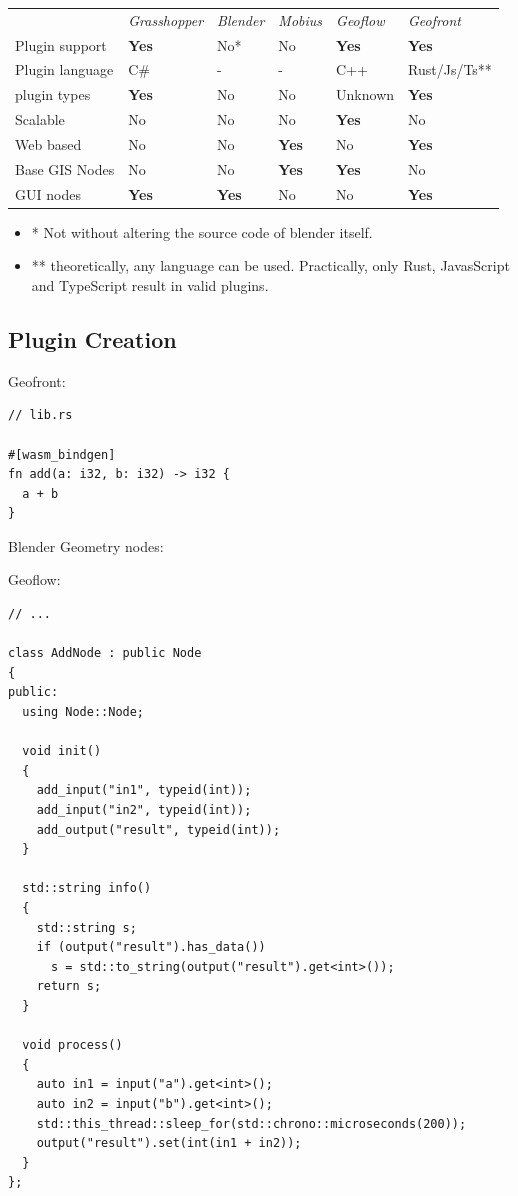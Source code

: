 \begin{tabular}{||p{2.8cm}|l|l|l|l|l||}
                  & \emph{Grasshopper} & \emph{Blender} & \emph{Mobius} & \emph{Geoflow}    & \emph{Geofront}   \\
Plugin support    & \textbf{Yes}  & No*    & No     & \textbf{Yes} & \textbf{Yes} \\
Plugin language   & C\#  & -    & -     & C++ & Rust/Js/Ts** \\
plugin types      & \textbf{Yes}  & No      & No     & Unknown    & \textbf{Yes} \\
Scalable          & No          & No      & No               & \textbf{Yes} & No         \\
Web based         & No          & No      & \textbf{Yes}     & No           & \textbf{Yes} \\
Base GIS Nodes    & No          & No      & \textbf{Yes}     & \textbf{Yes} & No \\
GUI nodes         & \textbf{Yes} & \textbf{Yes}      & No     & No          & \textbf{Yes} \\

\end{tabular}

\begin{itemize}[ ]
  \item * Not without altering the source code of blender itself.
  \item ** theoretically, any language can  be used. 
  Practically, only Rust, JavasScript and TypeScript result in valid plugins. 
\end{itemize}

\subsection{Plugin Creation}

Geofront:

\begin{lstlisting}
// lib.rs

#[wasm_bindgen]
fn add(a: i32, b: i32) -> i32 {
  a + b
}
\end{lstlisting}




Blender Geometry nodes: 



Geoflow:

\begin{lstlisting}
// ...

class AddNode : public Node
{
public:
  using Node::Node;

  void init()
  {
    add_input("in1", typeid(int));
    add_input("in2", typeid(int));
    add_output("result", typeid(int));
  }

  std::string info()
  {
    std::string s;
    if (output("result").has_data())
      s = std::to_string(output("result").get<int>());
    return s;
  }

  void process()
  {
    auto in1 = input("a").get<int>();
    auto in2 = input("b").get<int>();
    std::this_thread::sleep_for(std::chrono::microseconds(200));
    output("result").set(int(in1 + in2));
  }
};
\end{lstlisting}

